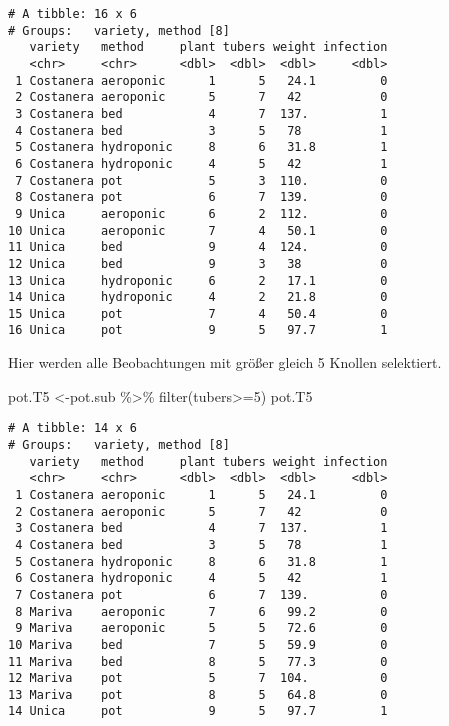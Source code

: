 \documentclass[
  letterpaper,
  DIV=11,
  numbers=noendperiod]{scrartcl}
\newenvironment{Shaded}{\begin{snugshade}}{\end{snugshade}}
\newcommand{\DecValTok}[1]{\textcolor[rgb]{0.68,0.00,0.00}{#1}}
\newcommand{\FunctionTok}[1]{\textcolor[rgb]{0.28,0.35,0.67}{#1}}
\newcommand{\NormalTok}[1]{\textcolor[rgb]{0.00,0.23,0.31}{#1}}
\newcommand{\OtherTok}[1]{\textcolor[rgb]{0.00,0.23,0.31}{#1}}
\newcommand{\SpecialCharTok}[1]{\textcolor[rgb]{0.37,0.37,0.37}{#1}}
\begin{document}
\begin{verbatim}
# A tibble: 16 x 6
# Groups:   variety, method [8]
   variety   method     plant tubers weight infection
   <chr>     <chr>      <dbl>  <dbl>  <dbl>     <dbl>
 1 Costanera aeroponic      1      5   24.1         0
 2 Costanera aeroponic      5      7   42           0
 3 Costanera bed            4      7  137.          1
 4 Costanera bed            3      5   78           1
 5 Costanera hydroponic     8      6   31.8         1
 6 Costanera hydroponic     4      5   42           1
 7 Costanera pot            5      3  110.          0
 8 Costanera pot            6      7  139.          0
 9 Unica     aeroponic      6      2  112.          0
10 Unica     aeroponic      7      4   50.1         0
11 Unica     bed            9      4  124.          0
12 Unica     bed            9      3   38           0
13 Unica     hydroponic     6      2   17.1         0
14 Unica     hydroponic     4      2   21.8         0
15 Unica     pot            7      4   50.4         0
16 Unica     pot            9      5   97.7         1
\end{verbatim}

Hier werden alle Beobachtungen mit größer gleich 5 Knollen selektiert.

\begin{Shaded}
\begin{Highlighting}[]
\NormalTok{pot.T5 }\OtherTok{\textless{}{-}}\NormalTok{pot.sub }\SpecialCharTok{\%\textgreater{}\%} \FunctionTok{filter}\NormalTok{(tubers}\SpecialCharTok{\textgreater{}=}\DecValTok{5}\NormalTok{)}
\NormalTok{pot.T5}
\end{Highlighting}
\end{Shaded}

\begin{verbatim}
# A tibble: 14 x 6
# Groups:   variety, method [8]
   variety   method     plant tubers weight infection
   <chr>     <chr>      <dbl>  <dbl>  <dbl>     <dbl>
 1 Costanera aeroponic      1      5   24.1         0
 2 Costanera aeroponic      5      7   42           0
 3 Costanera bed            4      7  137.          1
 4 Costanera bed            3      5   78           1
 5 Costanera hydroponic     8      6   31.8         1
 6 Costanera hydroponic     4      5   42           1
 7 Costanera pot            6      7  139.          0
 8 Mariva    aeroponic      7      6   99.2         0
 9 Mariva    aeroponic      5      5   72.6         0
10 Mariva    bed            7      5   59.9         0
11 Mariva    bed            8      5   77.3         0
12 Mariva    pot            5      7  104.          0
13 Mariva    pot            8      5   64.8         0
14 Unica     pot            9      5   97.7         1
\end{verbatim}
\end{document}
